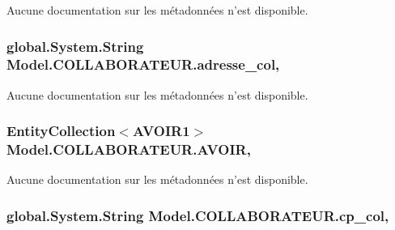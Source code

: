 Aucune documentation sur les métadonnées n'est disponible. 

\hypertarget{class_model_1_1_c_o_l_l_a_b_o_r_a_t_e_u_r_a3a3c271af8a2fa7f9d2d8f5600fb8e56}{
\subsubsection[{adresse\-\_\-col}]{\setlength{\rightskip}{0pt plus 5cm}global.\-System.\-String Model.\-C\-O\-L\-L\-A\-B\-O\-R\-A\-T\-E\-U\-R.\-adresse\-\_\-col\hspace{0.3cm}{\ttfamily [get]}, {\ttfamily [set]}}}\label{class_model_1_1_c_o_l_l_a_b_o_r_a_t_e_u_r_a3a3c271af8a2fa7f9d2d8f5600fb8e56}


Aucune documentation sur les métadonnées n'est disponible. 

\hypertarget{class_model_1_1_c_o_l_l_a_b_o_r_a_t_e_u_r_a948323a5e1d10ad783ec22e2a42b9a67}{
\subsubsection[{A\-V\-O\-I\-R}]{\setlength{\rightskip}{0pt plus 5cm}Entity\-Collection$<${\bf A\-V\-O\-I\-R1}$>$ Model.\-C\-O\-L\-L\-A\-B\-O\-R\-A\-T\-E\-U\-R.\-A\-V\-O\-I\-R\hspace{0.3cm}{\ttfamily [get]}, {\ttfamily [set]}}}\label{class_model_1_1_c_o_l_l_a_b_o_r_a_t_e_u_r_a948323a5e1d10ad783ec22e2a42b9a67}


Aucune documentation sur les métadonnées n'est disponible. 

\hypertarget{class_model_1_1_c_o_l_l_a_b_o_r_a_t_e_u_r_a264f8faf4646f7748ff732d79a4e54fd}{
\subsubsection[{cp\-\_\-col}]{\setlength{\rightskip}{0pt plus 5cm}global.\-System.\-String Model.\-C\-O\-L\-L\-A\-B\-O\-R\-A\-T\-E\-U\-R.\-cp\-\_\-col\hspace{0.3cm}{\ttfamily [get]}, {\ttfamily [set]}}}\label{class_model_1_1_c_o_l_l_a_b_o_r_a_t_e_u_r_a264f8faf4646f7748ff732d79a4e54fd}


